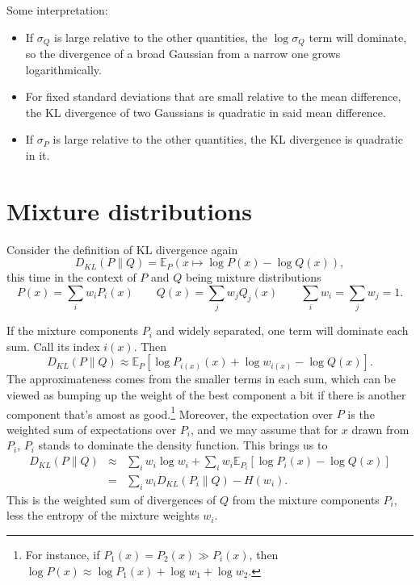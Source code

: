 \documentclass[12pt]{article}
\newcommand{\E}{\mathbb{E}}
\begin{document}
Some interpretation:
\begin{itemize}
\item If $\sigma_Q$ is large relative to the other quantities, the
  $\log \sigma_Q$ term will dominate, so the divergence of a broad
  Gaussian from a narrow one grows logarithmically.
\item For fixed standard deviations that are small relative to the
  mean difference, the KL divergence of two Gaussians is quadratic in
  said mean difference.
\item If $\sigma_P$ is large relative to the other quantities, the KL
  divergence is quadratic in it.
\end{itemize}

\section{Mixture distributions}

Consider the definition of KL divergence again
\[ D_{KL}(P\|Q) = \E_P (x \mapsto \log P(x) - \log Q(x)), \]
this time in the context of $P$ and $Q$ being mixture distributions
\[ P(x) = \sum_i w_iP_i(x) \qquad Q(x) = \sum_j w_jQ_j(x) \qquad \sum_iw_i = \sum_jw_j = 1. \]

If the mixture components $P_i$ and widely separated, one
term will dominate each sum.  Call its index $i(x)$.
Then
\[ D_{KL}(P\|Q) \approx \E_P \left[ \log P_{i(x)}(x) + \log w_{i(x)} - \log Q(x) \right]. \]
The approximateness comes from the smaller terms in each sum, which
can be viewed as bumping up the weight of the best component a bit if
there is another component that's amost as good.\footnote{For
  instance, if $P_1(x) = P_2(x) \gg P_i(x)$, then $\log P(x) \approx
  \log P_1(x) + \log w_1 + \log w_2$.}  Moreover, the expectation over
$P$ is the weighted sum of expectations over $P_i$, and we may assume
that for $x$ drawn from $P_i$, $P_i$ stands to dominate the density
function.  This brings us to
\begin{eqnarray*}
 D_{KL}(P\|Q) & \approx & \sum_i w_i \log w_i + \sum_i w_i \E_{P_i} \left[ \log P_i(x) - \log Q(x) \right] \\
 & = & \sum_i w_i D_{KL}(P_i\|Q) - H(w_i).
\end{eqnarray*}
This is the weighted sum of divergences of $Q$ from the mixture
components $P_i$, less the entropy of the mixture weights $w_i$.
\end{document}
